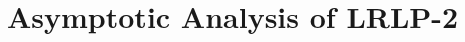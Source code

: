 \documentclass[11pt]{article}
\begin{document}



\section{Asymptotic Analysis of LRLP-2}
\label{sec:epiconvergence}
\end{document}
